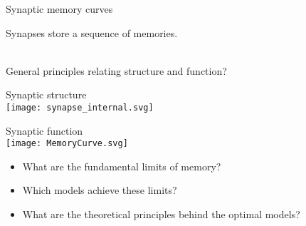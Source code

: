 \documentclass[final]{beamer}%
\begin{document}
\begin{frame}{Synaptic memory curves}
%
 \begin{center}
 \end{center}
 Synapses store a sequence of memories.\\
 \\
%
\end{frame}


\begin{frame}{General principles relating structure and function?}
%
 \vspace{-2\baselineskip}
 \begin{center}
 \parbox[t]{0.35\linewidth}{%
 \begin{center}
   Synaptic structure\\
   \texttt{[image: synapse\_internal.svg]}
 \end{center}
 }
 \hspace{0.1\linewidth}
 \parbox[t]{0.3\linewidth}{%
 \begin{center}
   Synaptic function\\
   \texttt{[image: MemoryCurve.svg]}
 \end{center}
 }
 \end{center}
 \begin{itemize}
   \item What are the fundamental limits of memory?
   \vp\item Which models achieve these limits?
   \vp\item What are the theoretical principles behind the optimal models?
 \end{itemize}
%
\end{frame}
\end{document}
